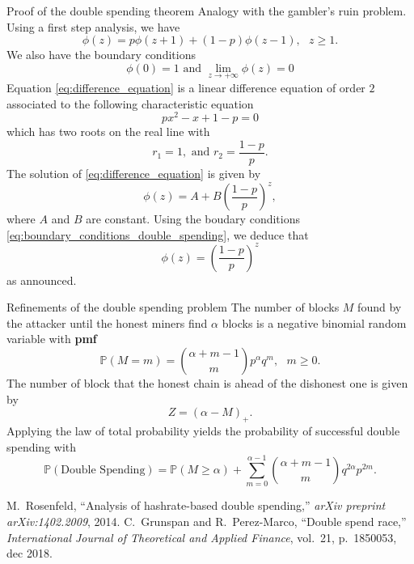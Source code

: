 \documentclass{beamer}
\makeatletter
\newcommand*{\pmf}{\textbf{pmf}\@\xspace}
\makeatother
\begin{document}
\begin{frame}[allowframebreaks]{Proof of the double spending theorem }
\scriptsize Analogy with the gambler's ruin problem. Using a first step analysis, we have 
\begin{equation}\label{eq:difference_equation}
\phi(z) = p\phi(z+1)+(1-p)\phi(z-1),\text{ }z\geq1.
\end{equation}
We also have the boundary conditions
\begin{equation}\label{eq:boundary_conditions_double_spending}
\phi(0) = 1\text{ and }\underset{z\rightarrow +\infty}{\lim}\phi(z) = 0
\end{equation}
Equation \eqref{eq:difference_equation} is a linear difference equation of order $2$ associated to the following characteristic equation
$$
px^2 - x + 1-p = 0
$$
which has two roots on the real line with 
$$
r_1 = 1, \text{ and }r_2 = \frac{1-p}{p}.
$$
The solution of \eqref{eq:difference_equation} is given by 
$$
\phi(z)=A+B\left(\frac{1-p}{p}\right)^z,
$$
where $A$ and $B$ are constant. Using the boudary conditions \eqref{eq:boundary_conditions_double_spending}, we deduce that
$$
\phi(z) = \left(\frac{1-p}{p}\right)^z
$$
as announced.
\end{frame}
\begin{frame}{Refinements of the double spending problem}
\scriptsize
The number of blocks $M$ found by the attacker until the honest miners find $\alpha$ blocks is a negative binomial random variable with \pmf
$$
\mathbb{P}(M = m) = \binom{\alpha+m-1}{m}p^\alpha q^m,\text{ }m\geq0.
$$
The number of block that the honest chain is ahead of the dishonest one is given by 
$$
Z= (\alpha-M)_+.
$$
Applying the law of total probability yields the probability of successful double spending with
$$
\mathbb{P}(\text{Double Spending}) = \mathbb{P}(M\geq \alpha) + \sum_{m = 0}^{\alpha - 1}\binom{\alpha+m-1}{m}q^{2\alpha} p^{2m}.
$$ 
\tiny


\begin{thebibliography}{1}
M.~Rosenfeld, ``Analysis of hashrate-based double spending,'' {\em arXiv
  preprint arXiv:1402.2009}, 2014.
C.~Grunspan and R.~Perez-Marco, ``Double spend race,'' {\em
  International Journal of Theoretical and Applied Finance}, vol.~21,
  p.~1850053, dec 2018.
\end{thebibliography}

\end{frame}
\end{document}
